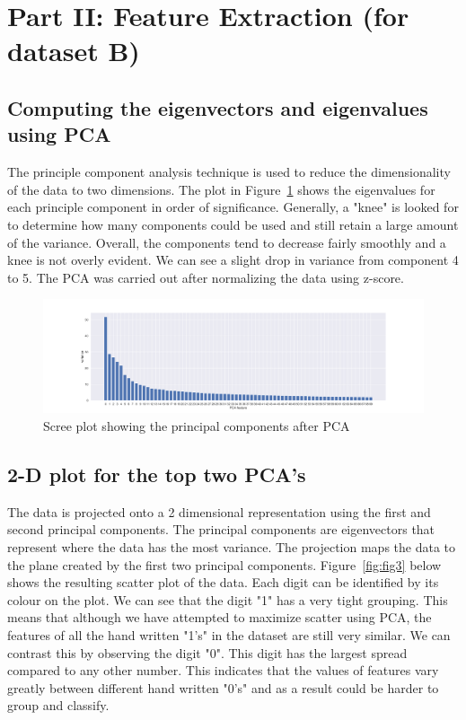 \section{Part II: Feature Extraction (for dataset B)}
\subsection{Computing the eigenvectors and eigenvalues using PCA}
The principle component analysis technique is used to reduce the dimensionality of the data to two dimensions. The plot in Figure~\ref{fig:fig2} shows the eigenvalues for each principle component in order of significance. Generally, a "knee" is looked for to determine how many components could be used and still retain a large amount of the variance. Overall, the components tend to decrease fairly smoothly and a knee is not overly evident. We can see a slight drop in variance from component 4 to 5. The PCA was carried out after normalizing the data using z-score.

\begin{figure}[htb]
 \centering
\includegraphics[width=\textwidth]{assignment1/2-1-pcafeatures.png}
\caption{\label{fig:fig2}Scree plot showing the principal components after PCA}
\end{figure}



\subsection{2-D plot for the top two PCA's}

The data is projected onto a 2 dimensional representation using the first and second principal components. The principal components are eigenvectors that represent where the data has the most variance. The projection maps the data to the plane created by the first two principal components. Figure~\ref{fig:fig3} below shows the resulting scatter plot of the data. Each digit can be identified by its colour on the plot. We can see that the digit "1" has a very tight grouping. This means that although we have attempted to maximize scatter using PCA, the features of all the hand written "1's" in the dataset are still very similar. We can contrast this by observing the digit "0". This digit has the largest spread compared to any other number. This indicates that the values of features vary greatly between different hand written "0's" and as a result could be harder to group and classify.


